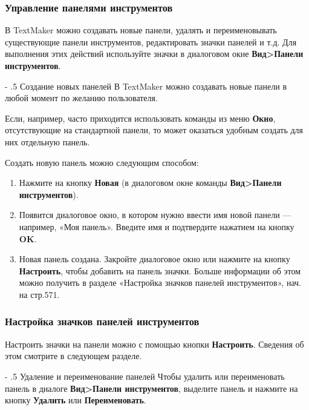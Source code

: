 ﻿\documentclass[a4paper,10pt]{article}
\makeatletter
\renewcommand\paragraph{%
   \@startsection{paragraph}{4}{0mm}%
      {-\baselineskip}%
      {.5\baselineskip}%
      {\normalfont\normalsize\bfseries}}
\makeatother
\begin{document}
 \subsubsection{Управление панелями инструментов}
 В TextMaker можно создавать новые панели, удалять и переименовывать существующие панели инструментов, редактировать значки панелей и т.д. Для выполнения этих действий используйте значки в диалоговом окне \textbf{Вид>Панели инструментов}.
 
 \paragraph{Создание новых панелей}
 В TextMaker можно создавать новые панели в любой момент по желанию пользователя.
 
 Если, например, часто приходится использовать команды из меню \textbf{Окно}, отсутствующие на стандартной панели, то может оказаться удобным создать для них отдельную панель.
 
 Создать новую панель можно следующим способом:
 \begin{enumerate}
  \item  Нажмите на кнопку \textbf{Новая} (в диалоговом окне команды \textbf{Вид>Панели инструментов}).
  \item Появится диалоговое окно, в котором нужно ввести имя новой панели — например, «Моя панель». Введите имя и подтвердите нажатием на кнопку \textbf{OK}.
  \item Новая панель создана. Закройте диалоговое окно или нажмите на кнопку \textbf{Настроить}, чтобы добавить на панель значки. Больше информации об этом можно получить в разделе «Настройка значков панелей инструментов», нач. на стр.571.
 \end{enumerate}
 
 \subsubsection{Настройка значков панелей инструментов}
 Настроить значки на панели можно с помощью кнопки \textbf{Настроить}. Сведения об этом смотрите в следующем разделе.
 
 \paragraph{Удаление и переименование панелей}
 Чтобы удалить или переименовать панель в диалоге \textbf{Вид>Панели инструментов}, выделите панель и нажмите на кнопку \textbf{Удалить} или \textbf{Переименовать}.
 
\end{document}
